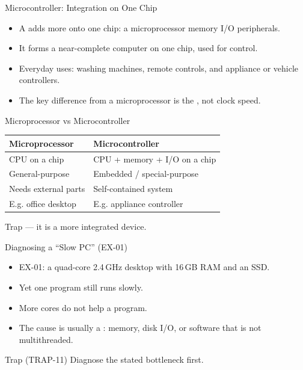 \documentclass[aspectratio=169]{beamer}
\begin{document}
\begin{frame}{Microcontroller: Integration on One Chip}
  \begin{itemize}
    \item A  adds more onto one chip: a microprocessor
       memory  I/O peripherals.
    \item It forms a near-complete computer on one chip, used for
       control.
    \item Everyday uses: washing machines, remote controls, and appliance or
      vehicle controllers.
    \item The key difference from a microprocessor is the , not clock speed.
  \end{itemize}
\end{frame}

\begin{frame}{Microprocessor vs Microcontroller}
  \begin{center}
    \begin{tabular}{ll}
      \toprule
      \textbf{Microprocessor} & \textbf{Microcontroller} \\
      \midrule
      CPU on a chip & CPU + memory + I/O on a chip \\
      General-purpose & Embedded / special-purpose \\
      Needs external parts & Self-contained system \\
      E.g. office desktop & E.g. appliance controller \\
      \bottomrule
    \end{tabular}
  \end{center}
  \begin{alertblock}{Trap}
     --- it is a
    more integrated device.
  \end{alertblock}
\end{frame}

\begin{frame}{Diagnosing a ``Slow PC'' (EX-01)}
  \begin{itemize}
    \item EX-01: a quad-core 2.4\,GHz desktop with 16\,GB RAM and an SSD.
    \item Yet one program still runs slowly.
    \item More cores do not help a  program.
    \item The cause is usually a : memory, disk I/O, or
      software that is not multithreaded.
  \end{itemize}
  \begin{alertblock}{Trap (TRAP-11)}
     Diagnose the
    stated bottleneck first.
  \end{alertblock}
\end{frame}
\end{document}
